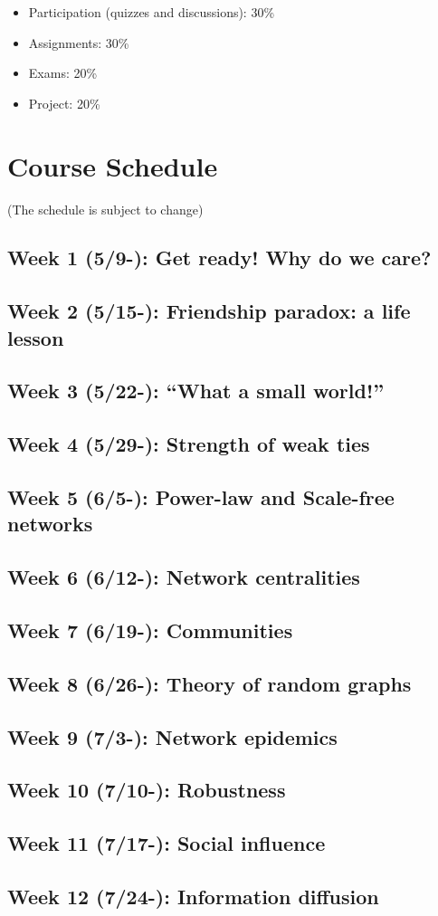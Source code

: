 \documentclass[11pt,article,oneside]{memoir}
\begin{document}
\begin{itemize}

\item Participation (quizzes and discussions): 30\%

\item Assignments: 30\%

\item Exams: 20\%

\item Project: 20\%


\end{itemize}

\section{Course Schedule}

(The schedule is subject to change)

\subsection{Week 1 (5/9-):  Get ready! Why do we care?}
\subsection{Week 2 (5/15-): Friendship paradox: a life lesson}
\subsection{Week 3 (5/22-): ``What a small world!''}
\subsection{Week 4 (5/29-): Strength of weak ties} %
\subsection{Week 5 (6/5-):  Power-law and Scale-free networks} %
\subsection{Week 6 (6/12-): Network centralities}
\subsection{Week 7 (6/19-): Communities} 
\subsection{Week 8 (6/26-): Theory of random graphs}
\subsection{Week 9 (7/3-):  Network epidemics}
\subsection{Week 10 (7/10-): Robustness}
\subsection{Week 11 (7/17-): Social influence}
\subsection{Week 12 (7/24-): Information diffusion}
\end{document}
